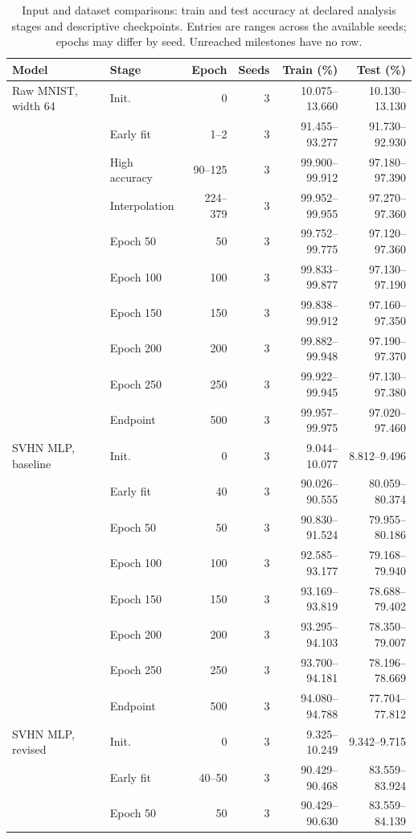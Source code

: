 \FloatBarrier
\begin{table}[!htbp]\centering
\caption{Input and dataset comparisons: train and test accuracy at declared analysis stages and descriptive checkpoints. Entries are ranges across the available seeds; epochs may differ by seed. Unreached milestones have no row.}\label{tab:perf-3-0}
\small\setlength{\tabcolsep}{4pt}
\begin{tabular}{llrrrr}\toprule
Model & Stage & Epoch & Seeds & Train (\%) & Test (\%)\\\midrule
Raw MNIST, width 64 & Init. & 0 & 3 & 10.075--13.660 & 10.130--13.130\\
 & Early fit & 1--2 & 3 & 91.455--93.277 & 91.730--92.930\\
 & High accuracy & 90--125 & 3 & 99.900--99.912 & 97.180--97.390\\
 & Interpolation & 224--379 & 3 & 99.952--99.955 & 97.270--97.360\\
 & Epoch 50 & 50 & 3 & 99.752--99.775 & 97.120--97.360\\
 & Epoch 100 & 100 & 3 & 99.833--99.877 & 97.130--97.190\\
 & Epoch 150 & 150 & 3 & 99.838--99.912 & 97.160--97.350\\
 & Epoch 200 & 200 & 3 & 99.882--99.948 & 97.190--97.370\\
 & Epoch 250 & 250 & 3 & 99.922--99.945 & 97.130--97.380\\
 & Endpoint & 500 & 3 & 99.957--99.975 & 97.020--97.460\\
\midrule
SVHN MLP, baseline & Init. & 0 & 3 & 9.044--10.077 & 8.812--9.496\\
 & Early fit & 40 & 3 & 90.026--90.555 & 80.059--80.374\\
 & Epoch 50 & 50 & 3 & 90.830--91.524 & 79.955--80.186\\
 & Epoch 100 & 100 & 3 & 92.585--93.177 & 79.168--79.940\\
 & Epoch 150 & 150 & 3 & 93.169--93.819 & 78.688--79.402\\
 & Epoch 200 & 200 & 3 & 93.295--94.103 & 78.350--79.007\\
 & Epoch 250 & 250 & 3 & 93.700--94.181 & 78.196--78.669\\
 & Endpoint & 500 & 3 & 94.080--94.788 & 77.704--77.812\\
\midrule
SVHN MLP, revised & Init. & 0 & 3 & 9.325--10.249 & 9.342--9.715\\
 & Early fit & 40--50 & 3 & 90.429--90.468 & 83.559--83.924\\
 & Epoch 50 & 50 & 3 & 90.429--90.630 & 83.559--84.139\\

\end{tabular}
\end{table}
